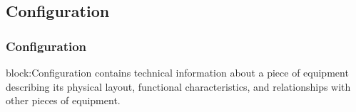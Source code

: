 \subsection{Configuration} \label{sec:Configuration}

\subsubsection{Configuration}
  \label{sec:Configuration}


{block:Configuration} contains technical information about a piece of equipment describing its physical layout, functional characteristics, and relationships with other pieces of equipment.

\FloatBarrier
